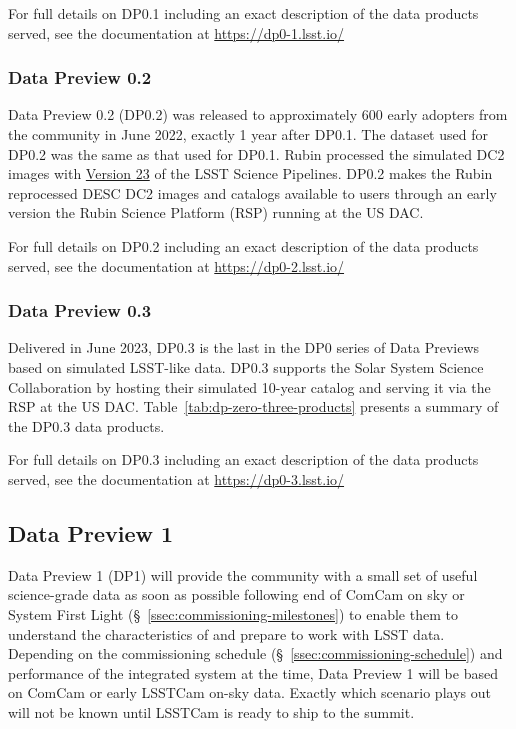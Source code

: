 For full details on DP0.1 including an exact description of the data products served, see the documentation at \url{https://dp0-1.lsst.io/}

\subsubsection{Data Preview 0.2}
\label{sec:dp02}

Data Preview 0.2 (DP0.2) was released to approximately 600 early adopters from the community in June 2022, exactly 1 year after DP0.1. 
The dataset used for DP0.2 was the same as that used for DP0.1.
Rubin processed the simulated DC2 images with \href{https://pipelines.lsst.io/v/v23_0_0/index.html}{Version 23} of the LSST Science Pipelines. 
DP0.2 makes the Rubin reprocessed DESC DC2 images and catalogs available to users through an early version the Rubin Science Platform (RSP) running at the US DAC. 

For full details on DP0.2 including an exact description of the data products served, see the documentation at \url{https://dp0-2.lsst.io/}

\subsubsection{Data Preview 0.3}
\label{sec:dp03}

Delivered in June  2023, DP0.3 is the last in the DP0 series of Data Previews based on simulated LSST-like data. 
DP0.3 supports the Solar System Science Collaboration by hosting their simulated 10-year catalog and serving it via the RSP at the US DAC. 
Table~\ref{tab:dp-zero-three-products} presents a summary of the  DP0.3 data products.

For full details on DP0.3 including an exact description of the data products served, see the documentation at \url{https://dp0-3.lsst.io/}

\subsection{Data Preview 1}
\label{sec:dp1}

Data Preview 1 (DP1) will provide the community with a small set of useful science-grade data as soon as possible following end of ComCam on sky or System First Light (\S~\ref{ssec:commissioning-milestones}) to enable them to understand the characteristics of and prepare to work with LSST data. 
Depending on the commissioning schedule (\S~\ref{ssec:commissioning-schedule}) and performance of the integrated system at the time, Data Preview 1 will be based on ComCam or early LSSTCam on-sky data.
Exactly which scenario plays out will not be known until LSSTCam is ready to ship to the summit. 

